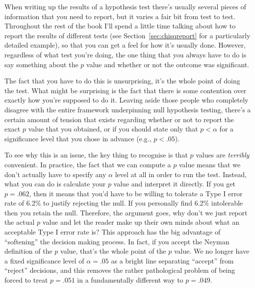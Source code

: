 When writing up the results of a hypothesis test there's usually several pieces of information that you need to report, but it varies a fair bit from test to test. Throughout the rest of the book I'll spend a little time talking about how to report the results of different tests (see Section~\ref{sec:chisqreport} for a particularly detailed example), so that you can get a feel for how it's usually done. However, regardless of what test you're doing, the one thing that you always have to do is say something about the $p$ value and whether or not the outcome was significant. 

The fact that you have to do this is unsurprising, it's the whole point of doing the test. What might be surprising is the fact that there is some contention over exactly how you're supposed to do it. Leaving aside those people who completely disagree with the entire framework underpinning null hypothesis testing, there's a certain amount of tension that exists regarding whether or not to report the exact $p$ value that you obtained, or if you should state only that $p < \alpha$ for a significance level that you chose in advance (e.g., $p<.05$). 


To see why this is an issue, the key thing to recognise is that $p$ values are {\it terribly} convenient. In practice, the fact that we can compute a $p$ value means that we don't actually have to specify any $\alpha$ level at all in order to run the test. Instead, what you can do is calculate your $p$ value and interpret it directly. If you get $p = .062$, then it means that you'd have to be willing to tolerate a Type I error rate of 6.2\% to justify rejecting the null. If you personally find 6.2\% intolerable then you retain the null. Therefore, the argument goes, why don't we just report the actual $p$ value and let the reader make up their own minds about what an acceptable Type I error rate is? This approach has the big advantage of ``softening'' the decision making process. In fact, if you accept the Neyman definition of the $p$ value, that's the whole point of the $p$ value. We no longer have a fixed significance level of $\alpha = .05$ as a bright line separating ``accept'' from ``reject'' decisions, and this removes the rather pathological problem of being forced to treat $p = .051$ in a fundamentally different way to $p = .049$. 

